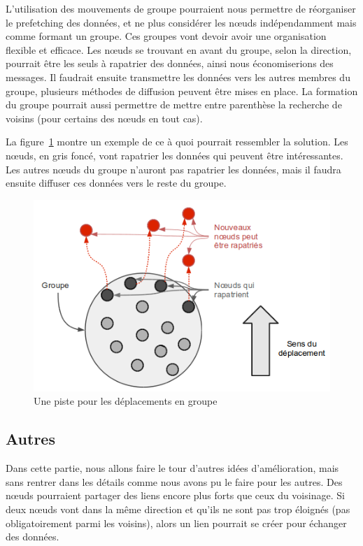 \par L'utilisation des mouvements de groupe pourraient nous permettre de réorganiser le prefetching des données, et ne plus considérer les nœuds indépendamment mais comme formant un groupe. Ces groupes vont devoir avoir une organisation flexible et efficace. Les nœuds se trouvant en avant du groupe, selon la direction, pourrait être les seuls à rapatrier des données, ainsi nous économiserions des messages. Il faudrait ensuite transmettre les données vers les autres membres du groupe, plusieurs méthodes de diffusion peuvent être mises en place. La formation du groupe pourrait aussi permettre de mettre entre parenthèse la recherche de voisins (pour certains des nœuds en tout cas). 
\par La figure~\ref{mouvgroup} montre un exemple de ce à quoi pourrait ressembler la solution. Les nœuds, en gris foncé, vont rapatrier les données qui peuvent être intéressantes. Les autres nœuds du groupe n'auront pas rapatrier les données, mais il faudra ensuite diffuser ces données vers le reste du groupe.

	\vspace{1cm}
        \begin{figure}[!h]
        \centering
        \includegraphics[scale=0.65]{./Ressources/Images/mouvgroup.png}
        \caption{Une piste pour les déplacements en groupe}
        \label{mouvgroup}
        \end{figure}

\newpage
\subsection{Autres}
Dans cette partie, nous allons faire le tour d'autres idées d'amélioration, mais sans rentrer dans les détails comme nous avons pu le faire pour les autres. Des nœuds pourraient partager des liens encore plus forts que ceux du voisinage. Si deux nœuds vont dans la même direction et qu'ils ne sont pas trop éloignés (pas obligatoirement parmi les voisins), alors un lien pourrait se créer pour échanger des données.

